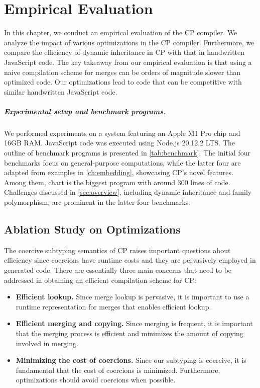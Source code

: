 \chapter{Empirical Evaluation} \label{ch:empirical}

In this chapter, we conduct an empirical evaluation of the CP compiler. We
analyze the impact of various optimizations in the CP compiler. Furthermore, we
compare the efficiency of dynamic inheritance in CP with that in handwritten
JavaScript code. The key takeaway from our empirical evaluation is that using a
naive compilation scheme for merges can be orders of magnitude slower than
optimized code. Our optimizations lead to code that can be competitive with
similar handwritten JavaScript code.

\paragraph{Experimental setup and benchmark programs.}
We performed experiments on a system featuring an Apple M1 Pro chip and 16GB
RAM. JavaScript code was executed using Node.js 20.12.2 LTS. The outline of
benchmark programs is presented in \autoref{tab:benchmark}. The initial four
benchmarks focus on general-purpose computations, while the latter four are
adapted from examples in \autoref{ch:embedding}, showcasing CP's novel features.
Among them, \textsf{chart} is the biggest program with around 300 lines of code.
Challenges discussed in \autoref{sec:overview}, including dynamic inheritance
and family polymorphism, are prominent in the latter four benchmarks.

\section{Ablation Study on Optimizations} \label{sec:optimization}

The coercive subtyping semantics of CP raises important questions about
efficiency since coercions have runtime costs and they are pervasively employed
in generated code. There are essentially three main concerns that need to be
addressed in obtaining an efficient compilation scheme for CP:

\begin{itemize}

\item \textbf{Efficient lookup.} Since merge lookup is pervasive, it is
      important to use a runtime representation for merges that enables
      efficient lookup.

\item \textbf{Efficient merging and copying.} Since merging is frequent, it is
      important that the merging process is efficient and minimizes the amount
      of copying involved in merging.

\item \textbf{Minimizing the cost of coercions.} Since our subtyping is
      coercive, it is fundamental that the cost of coercions is minimized.
      Furthermore, optimizations should avoid coercions when possible.
  
\end{itemize}

